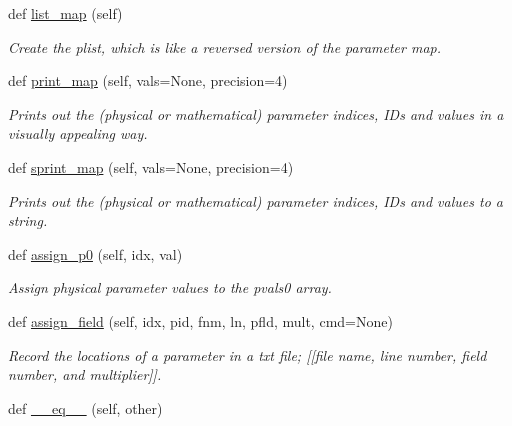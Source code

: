 \begin{DoxyCompactItemize}
def \hyperlink{classsrc_1_1ffyapf_1_1FF_a9efa0ddaab2f43cd5f0d2de090fc9f2e}{list\+\_\+map} (self)
\begin{DoxyCompactList}\small\item\em Create the plist, which is like a reversed version of the parameter map. \end{DoxyCompactList}\item 
def \hyperlink{classsrc_1_1ffyapf_1_1FF_a1f2342882083a5b59d8d76d13d6f666d}{print\+\_\+map} (self, vals=None, precision=4)
\begin{DoxyCompactList}\small\item\em Prints out the (physical or mathematical) parameter indices, I\+Ds and values in a visually appealing way. \end{DoxyCompactList}\item 
def \hyperlink{classsrc_1_1ffyapf_1_1FF_abca757d27cae3ee019e0b79f70ffd853}{sprint\+\_\+map} (self, vals=None, precision=4)
\begin{DoxyCompactList}\small\item\em Prints out the (physical or mathematical) parameter indices, I\+Ds and values to a string. \end{DoxyCompactList}\item 
def \hyperlink{classsrc_1_1ffyapf_1_1FF_a45405387da443c3cccedf420539f0f34}{assign\+\_\+p0} (self, idx, val)
\begin{DoxyCompactList}\small\item\em Assign physical parameter values to the \textquotesingle{}pvals0\textquotesingle{} array. \end{DoxyCompactList}\item 
def \hyperlink{classsrc_1_1ffyapf_1_1FF_a30c65ab08a53066ebd3be85de9f2dfba}{assign\+\_\+field} (self, idx, pid, fnm, ln, pfld, mult, cmd=None)
\begin{DoxyCompactList}\small\item\em Record the locations of a parameter in a txt file; \mbox{[}\mbox{[}file name, line number, field number, and multiplier\mbox{]}\mbox{]}. \end{DoxyCompactList}\item 
def \hyperlink{classsrc_1_1ffyapf_1_1FF_a31f154cb493aa2c1683da570ba1f8f0a}{\+\_\+\+\_\+eq\+\_\+\+\_\+} (self, other)
\end{DoxyCompactItemize}

